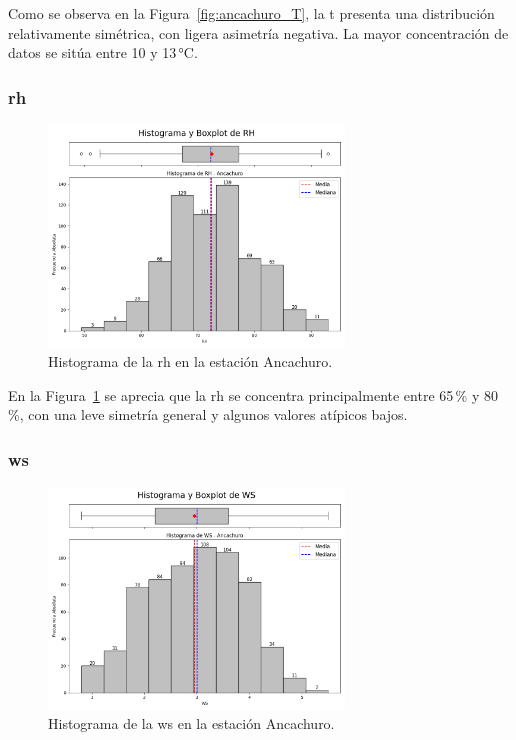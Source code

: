 Como se observa en la Figura~\ref{fig:ancachuro_T}, la \gls{t} presenta una distribución relativamente simétrica, con ligera asimetría negativa. La mayor concentración de datos se sitúa entre 10 y 13\,\si{\degreeCelsius}.

\subsubsection*{\gls{rh}}

\begin{figure}[htbp]
\centering
\includegraphics[width=0.7\textwidth]{resultados/por_estacion_meteorologica/Ancachuro/RH_histograma.png}
\caption{Histograma de la \gls{rh} en la estación Ancachuro.}
\label{fig:ancachuro_RH}
\end{figure}

En la Figura~\ref{fig:ancachuro_RH} se aprecia que la \gls{rh} se concentra principalmente entre 65\,\% y 80\,\%, con una leve simetría general y algunos valores atípicos bajos.

\subsubsection*{\gls{ws}}

\begin{figure}[htbp]
\centering
\includegraphics[width=0.7\textwidth]{resultados/por_estacion_meteorologica/Ancachuro/WS_histograma.png}
\caption{Histograma de la \gls{ws} en la estación Ancachuro.}
\label{fig:ancachuro_WS}
\end{figure}

